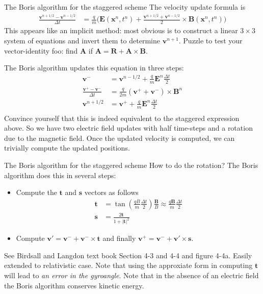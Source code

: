 \documentclass[pdf]{beamer}
\newcommand{\mvec}[1]{\mathbf{#1}}
\theoremstyle{definition}
\begin{document}
\begin{frame}{The Boris algorithm for the staggered scheme}
  \footnotesize%
  The velocity update formula is
  \begin{align*}
    \frac{\mvec{v}^{n+1/2}-\mvec{v}^{n-1/2}}{\Delta t} &= \frac{q}{m}
      \big(
        \mvec{E}(\mvec{x}^n,t^n) +
        \frac{\mvec{v}^{n+1/2}+\mvec{v}^{n-1/2}}{2}\times\mvec{B}(\mvec{x}^n,t^n)
      \big)
  \end{align*}
  This appears like an implicit method: most obvious is to construct a
  linear $3\times 3$ system of equations and invert them to determine
  $\mvec{v}^{n+1}$. Puzzle to test your vector-identity foo: find
  $\mvec{A}$ if $\mvec{A} = \mvec{R}+\mvec{A}\times\mvec{B}$.

  The Boris algorithm updates this equation in three steps:
  \begin{align*}
    \mvec{v}^- &= \mvec{v}^{n-1/2} + \frac{q}{m}\mvec{E}^n\frac{\Delta t}{2} \\
    \frac{\mvec{v}^+- \mvec{v}^-}{\Delta t}
    &=
      \frac{q}{2 m}(\mvec{v}^++\mvec{v}^-)\times\mvec{B}^n \\
    \mvec{v}^{n+1/2}
    &=
      \mvec{v}^{+} + \frac{q}{m}\mvec{E}^n\frac{\Delta t}{2} \\    
  \end{align*}
  Convince yourself that this is indeed equivalent to the staggered
  expression above. So we have two electric field updates with half
  time-steps and a rotation due to the magnetic field. Once the
  updated velocity is computed, we can trivially compute the updated
  positions.
\end{frame}

\begin{frame}{The Boris algorithm for the staggered scheme}
  \small%
  How to do the rotation? The Boris algorithm does this in several
  steps:
  \begin{itemize}
  \item Compute the $\mvec{t}$ and $\mvec{s}$ vectors as follows
    \begin{align*}
      \mvec{t} &= \tan\left( \frac{qB}{m}\frac{\Delta t}{2} \right) \frac{\mvec{B}}{B}
                 \approx \frac{q\mvec{B}}{m}\frac{\Delta t}{2} \\
      \mvec{s} &= \frac{2\mvec{t}}{1+|\mvec{t}|^2}
    \end{align*}
  \item Compute $\mvec{v}' = \mvec{v}^- + \mvec{v}^-\times\mvec{t}$
    and finally $\mvec{v}^+ = \mvec{v}^-+\mvec{v}'\times\mvec{s}$.
  \end{itemize}
  See Birdsall and Langdon text book Section 4-3 and 4-4 and figure
  4-4a. Easily extended to relativistic case. Note that using the
  approxiate form in computing $\mvec{t}$ will lead to \emph{an error
    in the gyroangle}.
  \vskip0.1in%
  Note that in the absence of an electric field the Boris algorithm
  conserves kinetic energy.
\end{frame}
\end{document}

